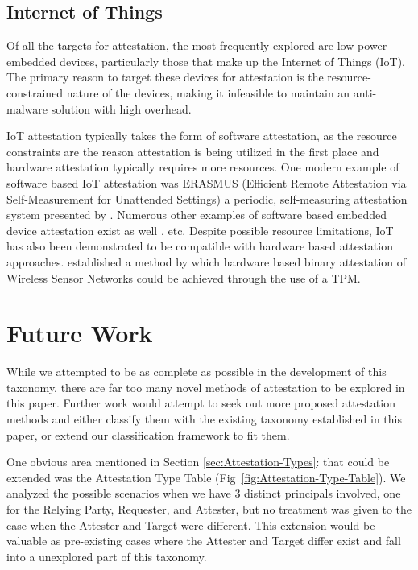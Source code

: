 \documentclass[acmsmall]{acmart}
\theoremstyle{definition}
\newcommand{\secref}[1]{Section \ref{#1}: \nameref{#1}}
\begin{document}
\subsection{Internet of Things}
Of all the targets for attestation, the most frequently explored are low-power embedded devices, particularly those that make up the Internet of Things (IoT).
The primary reason to target these devices for attestation is the resource-constrained nature of the devices, making it infeasible to 
maintain an anti-malware solution with high overhead.

IoT attestation typically takes the form of software attestation,
as the resource constraints are the reason attestation is being
utilized in the first place and hardware attestation typically requires
more resources.
One modern example of software based IoT attestation was ERASMUS (Efficient Remote Attestation via Self-Measurement for Unattended Settings) a periodic, self-measuring attestation system presented by \citet{carpent2018erasmus}.
Numerous other examples of software based embedded device attestation exist as well \cite{Javaid:2020:Defining-Trust-IoT-Blockchain-Attestation,nunes2019vrased,Nunes:2021:TOCTOU-Remote-Attestation}, etc.
Despite possible resource limitations, IoT has also been demonstrated 
to be compatible with hardware based attestation approaches.
\citet{Tan:2011:TRAP} established a method by which hardware based binary attestation of Wireless Sensor Networks could be achieved through the use of a TPM. 


\section{Future Work} \label{sec:Future-Work}
While we attempted to be as complete as possible in the development of this taxonomy,
there are far too many novel methods of attestation to be explored
in this paper. Further work would attempt to seek out more proposed attestation methods
and either classify them with the existing taxonomy established in this paper, or
extend our classification framework to fit them.

One obvious area mentioned in \secref{sec:Attestation-Types} that could be extended was
the Attestation Type Table (Fig~\ref{fig:Attestation-Type-Table}).
We analyzed the possible scenarios when we have 3 distinct principals involved,
one for the Relying Party, Requester, and Attester,
but no treatment was given to the case when the Attester and Target were different.
This extension would be valuable as pre-existing cases where the Attester and Target
differ exist and fall into a unexplored part of this taxonomy.
\end{document}
